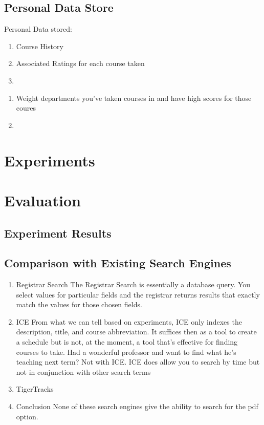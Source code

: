 \documentclass[12pt,letterpaper]{article}
\begin{document}
\subsection{Personal Data Store}
Personal Data stored:
\begin{enumerate}
\item Course History
\item Associated Ratings for each course taken
\item 
\end{enumerate}

\begin{enumerate}
\item Weight departments you've taken courses in and have high scores for those coures
\item 
\end{enumerate}
\section{Experiments}

\section{Evaluation}
\subsection{Experiment Results}
\subsection{Comparison with Existing Search Engines}
\begin{enumerate}
\item Registrar Search
  The Registrar Search is essentially a database query. You select values for particular fields and the registrar returns results that exactly match the values for those chosen fields.
  
\item ICE
  From what we can tell based on experiments, ICE only indexes the description, title, and course abbreviation. It suffices then as a tool to create a schedule but is not, at the moment, a tool that's effective for finding courses to take. Had a wonderful professor and want to find what he's teaching next term? Not with ICE. ICE does allow you to search by time but not in conjunction with other search terms 
  
\item TigerTracks
  
\item Conclusion
  None of these search engines give the ability to search for the pdf option. 
\end{enumerate}
\end{document}
